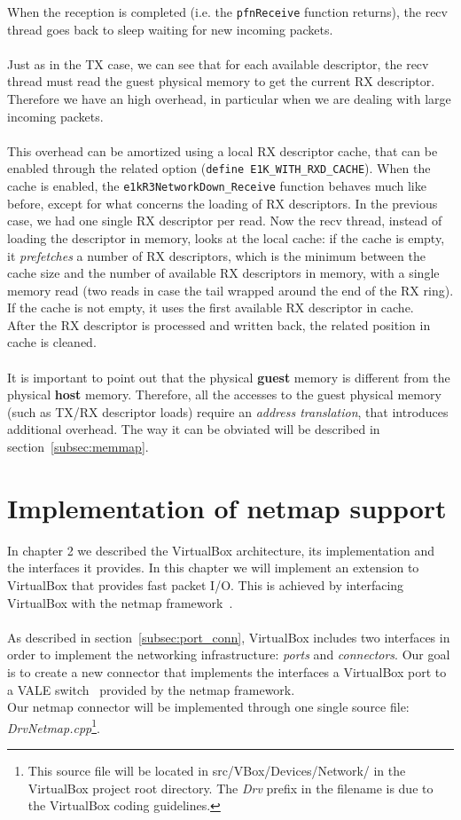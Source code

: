 \documentclass[a4paper, 12pt, titlepage]{report}
\begin{document}
When the reception is completed (i.e. the \texttt{pfnReceive} function returns), the recv thread goes back to sleep waiting for new incoming packets.
\\
\\
Just as in the TX case, we can see that for each available descriptor, the recv thread must read the guest physical memory to get the current RX descriptor. Therefore we have an high overhead, in particular when we are dealing with large incoming packets.
\\
\\
This overhead can be amortized using a local RX descriptor cache, that can be enabled through the related option (\texttt{define E1K\_WITH\_RXD\_CACHE}). When the cache is enabled, the \texttt{e1kR3NetworkDown\_Receive} function behaves much like before, except for what concerns the loading of RX descriptors. In the previous case, we had one single RX descriptor per read. Now the recv thread, instead of loading the descriptor in memory, looks at the local cache: if the cache is empty, it \textit{prefetches} a number of RX descriptors, which is the minimum between the cache size and the number of available RX descriptors in memory, with a single memory read (two reads in case the tail wrapped around the end of the RX ring). If the cache is not empty, it uses the first available RX descriptor in cache.
\\
After the RX descriptor is processed and written back, the related position in cache is cleaned.
\\
\\
It is important to point out that the physical \textbf{guest} memory is different from the physical \textbf{host} memory. Therefore, all the accesses to the guest physical memory (such as TX/RX descriptor loads) require an \textit{address translation}, that introduces additional overhead. The way it can be obviated will be described in section~\ref{subsec:memmap}.

\chapter{Implementation of netmap support}
In chapter 2 we described the VirtualBox architecture, its implementation and the interfaces it provides. In this chapter we will implement an extension to VirtualBox that provides fast packet I/O. This is achieved by interfacing VirtualBox with the netmap framework~\cite{netmap}.
\\
\\
As described in section~\ref{subsec:port_conn}, VirtualBox includes two interfaces in order to implement the networking infrastructure: \textit{ports} and \textit{connectors}. Our goal is to create a new connector that implements the interfaces a VirtualBox port to a VALE switch~\cite{vale} provided by the netmap framework.
\\
Our netmap connector will be implemented through one single source file: \textit{DrvNetmap.cpp}\footnote{This source file will be located in src/VBox/Devices/Network/ in the VirtualBox project root directory. The \textit{Drv} prefix in the filename is due to the VirtualBox coding guidelines.}.
\end{document}
